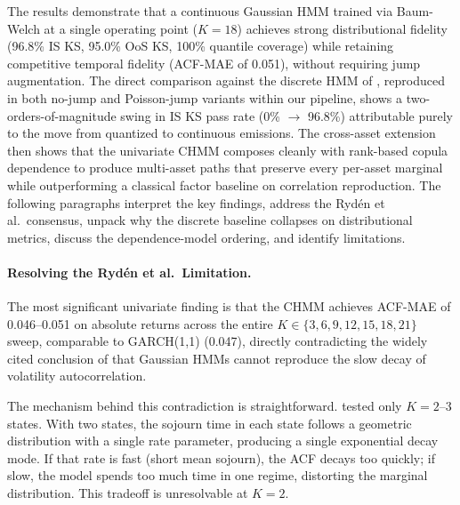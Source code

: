The results demonstrate that a continuous Gaussian HMM trained via Baum-Welch at a single operating point ($K = 18$) achieves strong distributional fidelity (96.8\% IS KS, 95.0\% OoS KS, 100\% quantile coverage) while retaining competitive temporal fidelity (ACF-MAE of 0.051), without requiring jump augmentation.
The direct comparison against the discrete HMM of \citet{alswaidan2026hybrid}, reproduced in both no-jump and Poisson-jump variants within our pipeline, shows a two-orders-of-magnitude swing in IS KS pass rate (0\% $\to$ 96.8\%) attributable purely to the move from quantized to continuous emissions.
The cross-asset extension then shows that the univariate CHMM composes cleanly with rank-based copula dependence to produce multi-asset paths that preserve every per-asset marginal while outperforming a classical factor baseline on correlation reproduction.
The following paragraphs interpret the key findings, address the Ryd\'{e}n et al.\ consensus, unpack why the discrete baseline collapses on distributional metrics, discuss the dependence-model ordering, and identify limitations.

\paragraph{Resolving the Ryd\'{e}n et al.\ Limitation.}
The most significant univariate finding is that the CHMM achieves ACF-MAE of 0.046--0.051 on absolute returns across the entire $K \in \{3, 6, 9, 12, 15, 18, 21\}$ sweep, comparable to GARCH(1,1) (0.047), directly contradicting the widely cited conclusion of \citet{ryden1998stylized} that Gaussian HMMs cannot reproduce the slow decay of volatility autocorrelation.

The mechanism behind this contradiction is straightforward.
\citet{ryden1998stylized} tested only $K = 2$--$3$ states.
With two states, the sojourn time in each state follows a geometric distribution with a single rate parameter, producing a single exponential decay mode.
If that rate is fast (short mean sojourn), the ACF decays too quickly; if slow, the model spends too much time in one regime, distorting the marginal distribution.
This tradeoff is unresolvable at $K = 2$.

